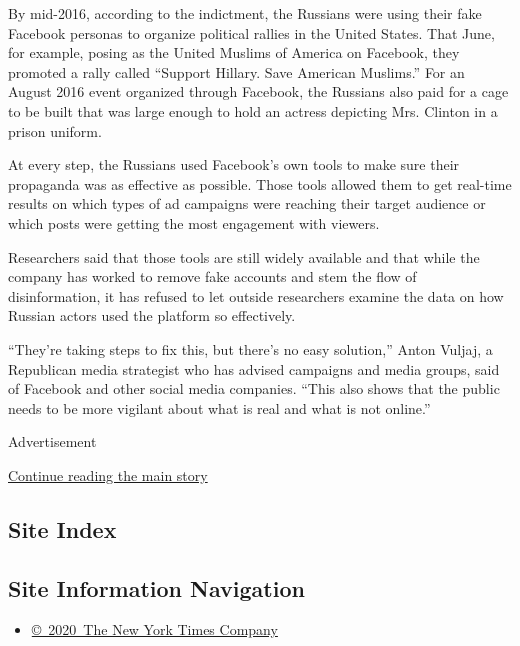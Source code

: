 By mid-2016, according to the indictment, the Russians were using their
fake Facebook personas to organize political rallies in the United
States. That June, for example, posing as the United Muslims of America
on Facebook, they promoted a rally called ``Support Hillary. Save
American Muslims.'' For an August 2016 event organized through Facebook,
the Russians also paid for a cage to be built that was large enough to
hold an actress depicting Mrs. Clinton in a prison uniform.

At every step, the Russians used Facebook's own tools to make sure their
propaganda was as effective as possible. Those tools allowed them to get
real-time results on which types of ad campaigns were reaching their
target audience or which posts were getting the most engagement with
viewers.

Researchers said that those tools are still widely available and that
while the company has worked to remove fake accounts and stem the flow
of disinformation, it has refused to let outside researchers examine the
data on how Russian actors used the platform so effectively.

``They're taking steps to fix this, but there's no easy solution,''
Anton Vuljaj, a Republican media strategist who has advised campaigns
and media groups, said of Facebook and other social media companies.
``This also shows that the public needs to be more vigilant about what
is real and what is not online.''

Advertisement

\protect\hyperlink{after-bottom}{Continue reading the main story}

\hypertarget{site-index}{%
\subsection{Site Index}\label{site-index}}

\hypertarget{site-information-navigation}{%
\subsection{Site Information
Navigation}\label{site-information-navigation}}

\begin{itemize}
\tightlist
\item
  \href{https://help.nytimes3xbfgragh.onion/hc/en-us/articles/115014792127-Copyright-notice}{©~2020~The
  New York Times Company}
\end{itemize}

